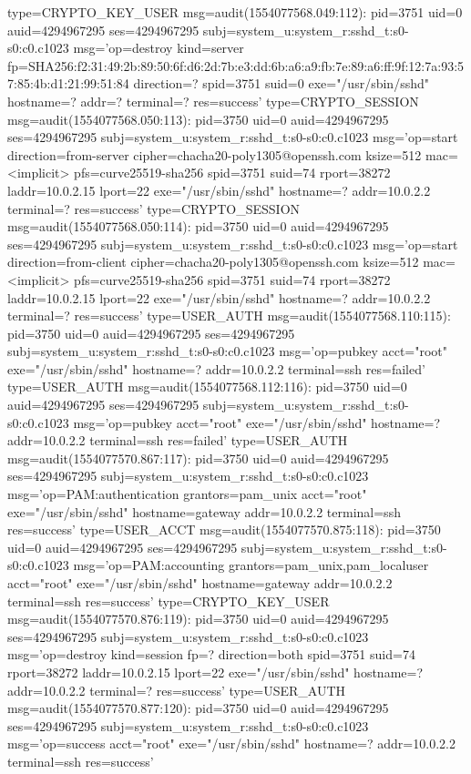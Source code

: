 \documentclass[]{report}
\newenvironment{Shaded}{}{}
\newcommand{\NormalTok}[1]{#1}
\begin{document}
\begin{Shaded}
\begin{Highlighting}[]
\NormalTok{type=CRYPTO_KEY_USER msg=audit(1554077568.049:112): pid=3751 uid=0 auid=4294967295 ses=4294967295 subj=system_u:system_r:sshd_t:s0-s0:c0.c1023 msg='op=destroy kind=server fp=SHA256:f2:31:49:2b:89:50:6f:d6:2d:7b:e3:dd:6b:a6:a9:fb:7e:89:a6:ff:9f:12:7a:93:57:85:4b:d1:21:99:51:84 direction=? spid=3751 suid=0  exe="/usr/sbin/sshd" hostname=? addr=? terminal=? res=success'}
\NormalTok{type=CRYPTO_SESSION msg=audit(1554077568.050:113): pid=3750 uid=0 auid=4294967295 ses=4294967295 subj=system_u:system_r:sshd_t:s0-s0:c0.c1023 msg='op=start direction=from-server cipher=chacha20-poly1305@openssh.com ksize=512 mac=<implicit> pfs=curve25519-sha256 spid=3751 suid=74 rport=38272 laddr=10.0.2.15 lport=22  exe="/usr/sbin/sshd" hostname=? addr=10.0.2.2 terminal=? res=success'}
\NormalTok{type=CRYPTO_SESSION msg=audit(1554077568.050:114): pid=3750 uid=0 auid=4294967295 ses=4294967295 subj=system_u:system_r:sshd_t:s0-s0:c0.c1023 msg='op=start direction=from-client cipher=chacha20-poly1305@openssh.com ksize=512 mac=<implicit> pfs=curve25519-sha256 spid=3751 suid=74 rport=38272 laddr=10.0.2.15 lport=22  exe="/usr/sbin/sshd" hostname=? addr=10.0.2.2 terminal=? res=success'}
\NormalTok{type=USER_AUTH msg=audit(1554077568.110:115): pid=3750 uid=0 auid=4294967295 ses=4294967295 subj=system_u:system_r:sshd_t:s0-s0:c0.c1023 msg='op=pubkey acct="root" exe="/usr/sbin/sshd" hostname=? addr=10.0.2.2 terminal=ssh res=failed'}
\NormalTok{type=USER_AUTH msg=audit(1554077568.112:116): pid=3750 uid=0 auid=4294967295 ses=4294967295 subj=system_u:system_r:sshd_t:s0-s0:c0.c1023 msg='op=pubkey acct="root" exe="/usr/sbin/sshd" hostname=? addr=10.0.2.2 terminal=ssh res=failed'}
\NormalTok{type=USER_AUTH msg=audit(1554077570.867:117): pid=3750 uid=0 auid=4294967295 ses=4294967295 subj=system_u:system_r:sshd_t:s0-s0:c0.c1023 msg='op=PAM:authentication grantors=pam_unix acct="root" exe="/usr/sbin/sshd" hostname=gateway addr=10.0.2.2 terminal=ssh res=success'}
\NormalTok{type=USER_ACCT msg=audit(1554077570.875:118): pid=3750 uid=0 auid=4294967295 ses=4294967295 subj=system_u:system_r:sshd_t:s0-s0:c0.c1023 msg='op=PAM:accounting grantors=pam_unix,pam_localuser acct="root" exe="/usr/sbin/sshd" hostname=gateway addr=10.0.2.2 terminal=ssh res=success'}
\NormalTok{type=CRYPTO_KEY_USER msg=audit(1554077570.876:119): pid=3750 uid=0 auid=4294967295 ses=4294967295 subj=system_u:system_r:sshd_t:s0-s0:c0.c1023 msg='op=destroy kind=session fp=? direction=both spid=3751 suid=74 rport=38272 laddr=10.0.2.15 lport=22  exe="/usr/sbin/sshd" hostname=? addr=10.0.2.2 terminal=? res=success'}
\NormalTok{type=USER_AUTH msg=audit(1554077570.877:120): pid=3750 uid=0 auid=4294967295 ses=4294967295 subj=system_u:system_r:sshd_t:s0-s0:c0.c1023 msg='op=success acct="root" exe="/usr/sbin/sshd" hostname=? addr=10.0.2.2 terminal=ssh res=success'}

\end{Highlighting}
\end{Shaded}
\end{document}
